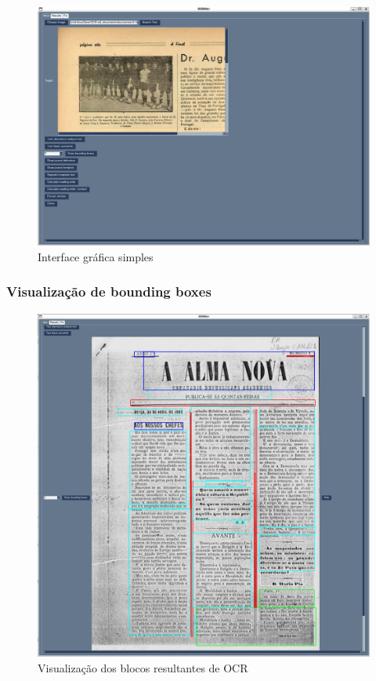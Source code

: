 \begin{figure}[H]
    \centering
    \includegraphics[width=1\textwidth]{images/implementacao/gui/gui_base.png}
    \caption{Interface gráfica simples}
    \label{fig:gui_base}
\end{figure}

\subsubsection{Visualização de bounding boxes}

\begin{figure}[H]
    \centering
    \includegraphics[width=1\textwidth]{images/implementacao/gui/gui_draw_bb.png}
    \caption{Visualização dos blocos resultantes de OCR}
    \label{fig:gui_draw_bb}
\end{figure}

